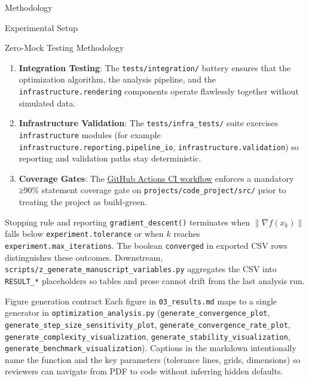 \documentclass[
  ignorenonframetext,
]{beamer}
\providecommand{\tightlist}{%
  \setlength{\itemsep}{0pt}\setlength{\parskip}{0pt}}
\begin{document}
\begin{frame}[fragile]{Methodology}
\begin{block}{Experimental Setup}
\begin{block}{Zero-Mock Testing Methodology}
\begin{enumerate}
\tightlist
\item
  \textbf{Integration Testing}: The \texttt{tests/integration/} battery
  ensures that the optimization algorithm, the analysis pipeline, and
  the \texttt{infrastructure.rendering} components operate flawlessly
  together without simulated data.
\item
  \textbf{Infrastructure Validation}: The \texttt{tests/infra\_tests/}
  suite exercises \texttt{infrastructure} modules (for example
  \texttt{infrastructure.reporting.pipeline\_io},
  \texttt{infrastructure.validation}) so reporting and validation paths
  stay deterministic.
\item
  \textbf{Coverage Gates}: The
  \href{https://github.com/docxology/template/blob/main/.github/workflows/ci.yml}{GitHub
  Actions CI workflow} enforces a mandatory ≥90\% statement coverage
  gate on \texttt{projects/code\_project/src/} prior to treating the
  project as build-green.
\end{enumerate}
\end{block}

\begin{block}{Stopping rule and reporting}
\protect{}\label{stopping-rule-and-reporting}
\texttt{gradient\_descent()} terminates when \(\|\nabla f(x_k)\|\) falls
below \texttt{experiment.tolerance} or when \(k\) reaches
\texttt{experiment.max\_iterations}. The boolean \texttt{converged} in
exported CSV rows distinguishes these outcomes. Downstream,
\texttt{scripts/z\_generate\_manuscript\_variables.py} aggregates the
CSV into \texttt{RESULT\_*} placeholders so tables and prose cannot
drift from the last analysis run.
\end{block}

\begin{block}{Figure generation contract}
\protect{}\label{figure-generation-contract}
Each figure in \texttt{03\_results.md} maps to a single generator in
\texttt{optimization\_analysis.py}
(\texttt{generate\_convergence\_plot},
\texttt{generate\_step\_size\_sensitivity\_plot},
\texttt{generate\_convergence\_rate\_plot},
\texttt{generate\_complexity\_visualization},
\texttt{generate\_stability\_visualization},
\texttt{generate\_benchmark\_visualization}). Captions in the markdown
intentionally name the function and the key parameters (tolerance lines,
grids, dimensions) so reviewers can navigate from PDF to code without
inferring hidden defaults.
\end{block}
\end{block}


\end{frame}
\end{document}
